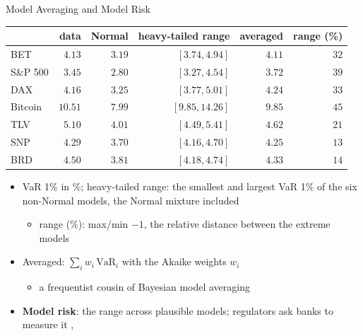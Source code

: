 \begin{frame}{Model Averaging and Model Risk}
\itemsize{\footnotesize}
\begin{center}
\scriptsize
\begin{tabular}{lrrrrr}
\toprule
& data & Normal & heavy-tailed range & averaged & range (\%) \\
\midrule
BET & $4.13$ & $3.19$ & $[3.74, 4.94]$ & $4.11$ & $32$ \\
S\&P 500 & $3.45$ & $2.80$ & $[3.27, 4.54]$ & $3.72$ & $39$ \\
DAX & $4.16$ & $3.25$ & $[3.77, 5.01]$ & $4.24$ & $33$ \\
Bitcoin & $10.51$ & $7.99$ & $[9.85, 14.26]$ & $9.85$ & $45$ \\
TLV & $5.10$ & $4.01$ & $[4.49, 5.41]$ & $4.62$ & $21$ \\
SNP & $4.29$ & $3.70$ & $[4.16, 4.70]$ & $4.25$ & $13$ \\
BRD & $4.50$ & $3.81$ & $[4.18, 4.74]$ & $4.33$ & $14$ \\
\bottomrule
\end{tabular}
\end{center}
\begin{itemize}
    \item VaR 1\% in \%; heavy-tailed range: the smallest and largest VaR 1\% of the six non-Normal models, the Normal mixture included
    \begin{itemize}
        \item range (\%): max/min $- 1$, the relative distance between the extreme models
    \end{itemize}
    \item Averaged: $\sum_i w_i\,\mathrm{VaR}_i$ with the Akaike weights $w_i$
    \begin{itemize}
        \item a frequentist cousin of Bayesian model averaging 
    \end{itemize}
    \item \textbf{Model risk}: the range across plausible models; regulators ask banks to measure it , 
\end{itemize}
\end{frame}

